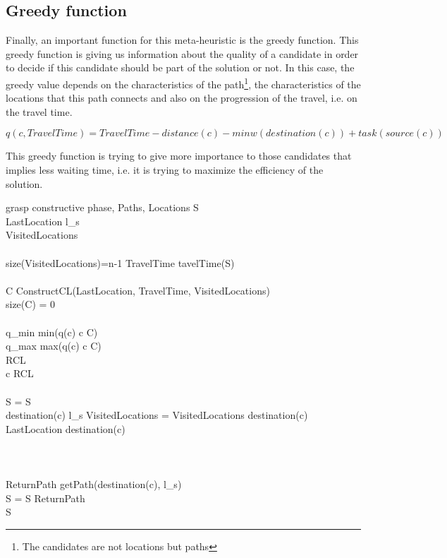 \documentclass[]{report}
\begin{document}
\subsection{Greedy function}
Finally, an important function for this meta-heuristic is the greedy function. This greedy function is giving us information about the quality of a candidate in order to decide if this candidate should be part of the solution or not. In this case, the greedy value depends on the characteristics of the path\footnote{The candidates are not locations but paths}, the characteristics of the locations that this path connects and also on the progression of the travel, i.e. on the travel time. 

$$ q(c, TravelTime) = TravelTime - distance(c) - minw(destination(c)) + task(source(c))$$

This greedy function is trying to give more importance to those candidates that implies less waiting time, i.e. it is trying to maximize the efficiency of the solution.

\begin{pseudocode}{grasp constructive phase}{\alpha, Paths, Locations}
\label{pc:constructive_phase}
	S \GETS \varnothing\\
	LastLocation \GETS l_{s}\\
	VisitedLocations \GETS \varnothing\\
	\\
	\WHILE \NOT size(VisitedLocations)=n-1 \DO
	\BEGIN
		TravelTime \GETS tavelTime(S)\\
		\\
		C \GETS ConstructCL(LastLocation, TravelTime, VisitedLocations)\\
		\IF size(C) = 0 \THEN
			\\
		
		\\
		q_{min} \GETS min(q(c) \quad \forall c \in C)\\
		q_{max} \GETS max(q(c) \quad \forall c \in C)\\
		RCL \\
		 c \in RCL \\
		\\
		S = S \\
		\IF destination(c) \neq l_{s} \THEN
			VisitedLocations = VisitedLocations \cup destination(c)\\
		LastLocation \GETS destination(c)\\
	\END\\
	\\
	\\
	ReturnPath \GETS getPath(destination(c), l_{s})\\
	S = S \cup ReturnPath\\
	
	\RETURN S

\end{pseudocode}
\end{document}
